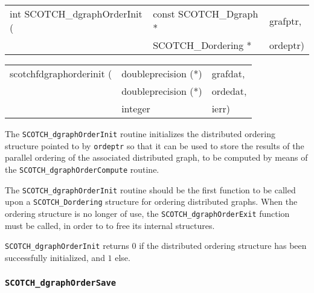 \begin{itemize}
\progsyn

{\tt\begin{tabular}{l@{}ll}
int SCOTCH\_dgraphOrderInit ( & const SCOTCH\_Dgraph * & grafptr, \\
                              & SCOTCH\_Dordering *    & ordeptr)
\end{tabular}}

{\tt\begin{tabular}{l@{}ll}
scotchfdgraphorderinit ( & doubleprecision (*) & grafdat, \\
                         & doubleprecision (*) & ordedat, \\
                         & integer             & ierr)
\end{tabular}}

\progdes

The {\tt SCOTCH\_dgraph\lbt Order\lbt Init} routine initializes the
distributed ordering structure pointed to by {\tt ordeptr} so that it
can be used to store the results of the parallel ordering of the
associated distributed graph, to be computed by means of the
{\tt SCOTCH\_\lbt dgraph\lbt Order\lbt Compute} routine.

The {\tt SCOTCH\_\lbt dgraph\lbt Order\lbt Init} routine should be the
first function to be called upon a {\tt SCOTCH\_\lbt Dordering}
structure for ordering distributed graphs. When the ordering structure
is no longer of use, the {\tt SCOTCH\_\lbt dgraph\lbt Order\lbt Exit}
function must be called, in order to to free its internal structures.

\progret

{\tt SCOTCH\_dgraphOrderInit} returns $0$ if the distributed ordering
structure has been successfully initialized, and $1$ else.
\end{itemize}

\subsubsection{{\tt SCOTCH\_dgraphOrderSave}}

